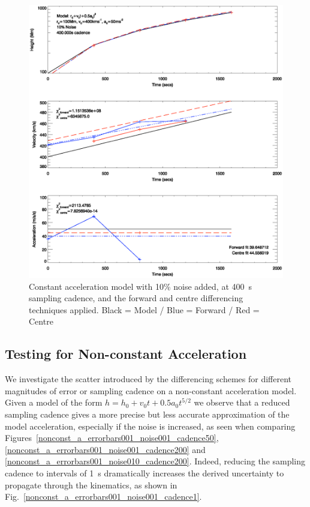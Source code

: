 \documentclass[namedreferences]{SolarPhysics}
\begin{document}
\begin{article}
\begin{figure}
 \centerline{\includegraphics[width=\linewidth]{images/const_a_forward_centre_noise010_cadence400.ps}}
   \caption{Constant acceleration model with 10\% noise added, at 400~s sampling cadence, and the forward and centre differencing techniques applied. Black = Model / Blue = Forward / Red = Centre}
    \label{const_a_forward_centre_noise010_cadence400}
\end{figure}

\subsection{Testing for Non-constant Acceleration}

We investigate the scatter introduced by the differencing schemes for different magnitudes of error or sampling cadence on a non-constant acceleration model. Given a model of the form $h=h_0+v_0t+0.5a_0t^{5/2}$ we observe that a reduced sampling cadence gives a more precise but less accurate approximation of the model acceleration, especially if the noise is increased, as seen when comparing Figures~\ref{nonconst_a_errorbars001_noise001_cadence50}, \ref{nonconst_a_errorbars001_noise001_cadence200} and \ref{nonconst_a_errorbars001_noise010_cadence200}. Indeed, reducing the sampling cadence to intervals of 1~s dramatically increases the derived uncertainty to propagate through the kinematics, as shown in Fig.~\ref{nonconst_a_errorbars001_noise001_cadence1}.



\end{article}
\end{document}

